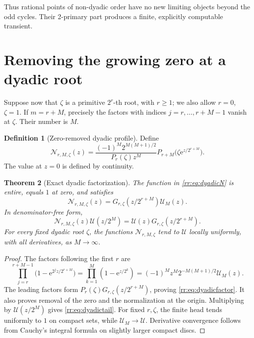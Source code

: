 \documentclass[11pt,a4paper,oneside,openany]{book}
\numberwithin{equation}{chapter}
\newtheorem{theorem}{Theorem}[chapter]
\theoremstyle{definition}
\newtheorem{definition}[theorem]{Definition}
\theoremstyle{remark}
\newcommand{\e}{\mathrm e}
\newcommand{\Up}{\mathcal U}
\newcommand{\Np}{\mathcal N}
\begin{document}
Thus rational points of non-dyadic order have no new limiting objects beyond the odd cycles. Their 2-primary part produces a finite, explicitly computable transient.

\section{Removing the growing zero at a dyadic root}
Suppose now that \(\zeta\) is a primitive \(2^r\)-th root, with \(r\geq1\); we also allow \(r=0\), \(\zeta=1\). If \(m=r+M\), precisely the factors with indices \(j=r,\ldots,r+M-1\) vanish at \(\zeta\). Their number is \(M\).

\begin{definition}[Zero-removed dyadic profile]
Define
\begin{equation}
 \Np_{r,M,\zeta}(z)=
 \frac{(-1)^M2^{M(M+1)/2}}{P_r(\zeta)z^M}
 P_{r+M}\bigl(\zeta\e^{z/2^{r+M}}\bigr).
 \label{rr:eq:dyadicN}
\end{equation}
The value at \(z=0\) is defined by continuity.
\end{definition}

\begin{theorem}[Exact dyadic factorization]
The function in \eqref{rr:eq:dyadicN} is entire, equals \(1\) at zero, and satisfies
\begin{equation}
 \Np_{r,M,\zeta}(z)=G_{r,\zeta}(z/2^{r+M})\Up_M(z).
 \label{rr:eq:dyadicfactor}
\end{equation}
In denominator-free form,
\begin{equation}
 \Np_{r,M,\zeta}(z)\Up(z/2^M)
 =\Up(z)G_{r,\zeta}(z/2^{r+M}).
 \label{rr:eq:dyadictail}
\end{equation}
For every fixed dyadic root \(\zeta\), the functions \(\Np_{r,M,\zeta}\) tend to \(\Up\) locally uniformly, with all derivatives, as \(M\to\infty\).
\end{theorem}
\begin{proof}
The factors following the first \(r\) are
\[
 \prod_{j=r}^{r+M-1}\bigl(1-\e^{2^jz/2^{r+M}}\bigr)
 =\prod_{k=1}^{M}(1-\e^{z/2^k})
 =(-1)^Mz^M2^{-M(M+1)/2}\Up_M(z).
\]
The leading factors form \(P_r(\zeta)G_{r,\zeta}(z/2^{r+M})\), proving \eqref{rr:eq:dyadicfactor}. It also proves removal of the zero and the normalization at the origin. Multiplying by \(\Up(z/2^M)\) gives \eqref{rr:eq:dyadictail}. For fixed \(r,\zeta\), the finite head tends uniformly to \(1\) on compact sets, while \(\Up_M\to\Up\). Derivative convergence follows from Cauchy's integral formula on slightly larger compact discs.
\end{proof}
\end{document}
